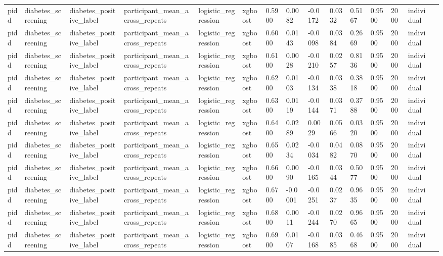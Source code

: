 \begin{tabular}{lllllllllllllll}
pidd & diabetes\_screening & diabetes\_positive\_label & participant\_mean\_across\_repeats & logistic\_regression & xgboost & 0.5900 & 0.0082 & -0.0172 & 0.0332 & 0.5167 & 0.9500 & 2000 & individual &  \\
pidd & diabetes\_screening & diabetes\_positive\_label & participant\_mean\_across\_repeats & logistic\_regression & xgboost & 0.6000 & 0.0143 & -0.0098 & 0.0384 & 0.2669 & 0.9500 & 2000 & individual &  \\
pidd & diabetes\_screening & diabetes\_positive\_label & participant\_mean\_across\_repeats & logistic\_regression & xgboost & 0.6100 & 0.0028 & -0.0210 & 0.0257 & 0.8136 & 0.9500 & 2000 & individual &  \\
pidd & diabetes\_screening & diabetes\_positive\_label & participant\_mean\_across\_repeats & logistic\_regression & xgboost & 0.6200 & 0.0103 & -0.0134 & 0.0338 & 0.3818 & 0.9500 & 2000 & individual &  \\
pidd & diabetes\_screening & diabetes\_positive\_label & participant\_mean\_across\_repeats & logistic\_regression & xgboost & 0.6300 & 0.0119 & -0.0144 & 0.0371 & 0.3788 & 0.9500 & 2000 & individual &  \\
pidd & diabetes\_screening & diabetes\_positive\_label & participant\_mean\_across\_repeats & logistic\_regression & xgboost & 0.6400 & 0.0289 & 0.0029 & 0.0566 & 0.0320 & 0.9500 & 2000 & individual &  \\
pidd & diabetes\_screening & diabetes\_positive\_label & participant\_mean\_across\_repeats & logistic\_regression & xgboost & 0.6500 & 0.0234 & -0.0034 & 0.0482 & 0.0870 & 0.9500 & 2000 & individual &  \\
pidd & diabetes\_screening & diabetes\_positive\_label & participant\_mean\_across\_repeats & logistic\_regression & xgboost & 0.6600 & 0.0090 & -0.0165 & 0.0344 & 0.5077 & 0.9500 & 2000 & individual &  \\
pidd & diabetes\_screening & diabetes\_positive\_label & participant\_mean\_across\_repeats & logistic\_regression & xgboost & 0.6700 & -0.0001 & -0.0251 & 0.0237 & 0.9635 & 0.9500 & 2000 & individual &  \\
pidd & diabetes\_screening & diabetes\_positive\_label & participant\_mean\_across\_repeats & logistic\_regression & xgboost & 0.6800 & 0.0011 & -0.0244 & 0.0270 & 0.9665 & 0.9500 & 2000 & individual &  \\
pidd & diabetes\_screening & diabetes\_positive\_label & participant\_mean\_across\_repeats & logistic\_regression & xgboost & 0.6900 & 0.0107 & -0.0168 & 0.0385 & 0.4668 & 0.9500 & 2000 & individual &  \\

\end{tabular}

